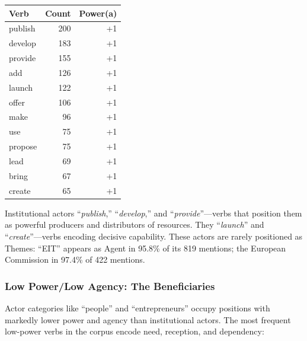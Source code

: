 \documentclass[../main.tex]{subfiles}
\begin{document}
\begin{center}
\small
\begin{tabular}{lrr}
\toprule
\textbf{Verb} & \textbf{Count} & \textbf{Power(a)} \\
\midrule
publish & 200 & +1 \\
develop & 183 & +1 \\
provide & 155 & +1 \\
add & 126 & +1 \\
launch & 122 & +1 \\
offer & 106 & +1 \\
make & 96 & +1 \\
use & 75 & +1 \\
propose & 75 & +1 \\
lead & 69 & +1 \\
bring & 67 & +1 \\
create & 65 & +1 \\
\bottomrule
\end{tabular}
\end{center}

Institutional actors ``\textit{publish},'' ``\textit{develop},'' and ``\textit{provide}''---verbs that position them as powerful producers and distributors of resources. They ``\textit{launch}'' and ``\textit{create}''---verbs encoding decisive capability. These actors are rarely positioned as Themes: ``EIT'' appears as Agent in 95.8\% of its 819 mentions; the European Commission in 97.4\% of 422 mentions.

\subsubsection{Low Power/Low Agency: The Beneficiaries}

Actor categories like ``people'' and ``entrepreneurs'' occupy positions with markedly lower power and agency than institutional actors. The most frequent low-power verbs in the corpus encode need, reception, and dependency:
\end{document}
